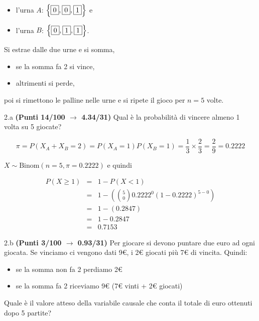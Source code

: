 \documentclass[
  11pt,
]{book}
\providecommand{\tightlist}{%
  \setlength{\itemsep}{0pt}\setlength{\parskip}{0pt}}
\theoremstyle{mytheoremstyle}
\theoremstyle{mydefstyle}
\newenvironment{sol}
  {
  \begin{tcolorbox}[enhanced,breakable,arc=0.1mm,boxrule=1pt,colback=white,colframe=iblue,
  title=\bf \fontfamily{lmss}\selectfont \hspace{.5 cm} Soluzione,drop fuzzy shadow]

}{
\end{tcolorbox}
  }
\begin{document}
\begin{itemize}
\tightlist
\item
  l'urna \(A\): \(\left\{\fbox{0},\fbox{0},\fbox{1}\right\}\) e
\item
  l'urna \(B\): \(\left\{\fbox{0},\fbox{1},\fbox{1}\right\}\).
\end{itemize}

Si estrae dalle due urne e si somma,

\begin{itemize}
\tightlist
\item
  se la somma fa 2 si vince,
\item
  altrimenti si perde,
\end{itemize}

poi si rimettono le palline nelle urne e si ripete il gioco per \(n=5\) volte.

2.a \textbf{(Punti 14/100 \(\rightarrow\) 4.34/31)} Qual è la probabilità di vincere almeno 1 volta su 5 giocate?

\begin{sol}
\[
\pi=P(X_A+X_B=2)=P(X_A=1)P(X_B=1)=\frac 13\times\frac23=\frac29=0.2222
\]

\(X\sim\text{Binom}(n=5,\pi=0.2222)\) e quindi

\normalsize 
\begin{eqnarray*}
      P( X \geq 1 ) &=& 1-P( X < 1 ) \\                 &=& 1-\left( \binom{ 5 }{ 0 } 0.2222 ^{ 0 }(1- 0.2222 )^{ 5 - 0 } \right)\\                 &=& 1-( 0.2847 )\\                 &=& 1- 0.2847 \\                 &=&   0.7153 
   \end{eqnarray*}
\normalsize 

\end{sol}

2.b \textbf{(Punti 3/100 \(\rightarrow\) 0.93/31)} Per giocare si devono puntare due euro ad ogni giocata. Se vinciamo ci vengono dati 9€, i 2€ giocati più 7€ di vincita. Quindi:

\begin{itemize}
\tightlist
\item
  se la somma non fa 2 perdiamo 2€
\item
  se la somma fa 2 riceviamo 9€ (7€ vinti + 2€ giocati)
\end{itemize}

Quale è il valore atteso della variabile causale che conta il totale di euro ottenuti dopo 5 partite?
\end{document}
